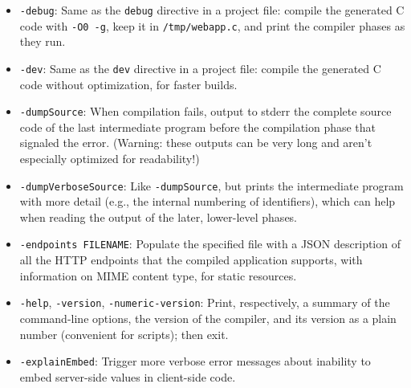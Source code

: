 \documentclass{article}
\begin{document}
\begin{itemize}
\begin{itemize}
    A command sequence like this can initialize a MySQL database:
    \begin{verbatim}
echo "CREATE DATABASE app" | mysql
mysql -D app <app.sql
    \end{verbatim}

  \item \texttt{sqlite}: This is SQLite, a simple filesystem-based transactional database engine.  With this backend, Ur/Web applications can run without any additional server processes.  The other engines are generally preferred for large-workload performance and full admin feature sets, while SQLite is popular for its low resource footprint and ease of set-up.

    A command like this can initialize an SQLite database:
    \begin{verbatim}
sqlite3 path/to/database/file <app.sql
    \end{verbatim}
  \end{itemize}

\item \texttt{-debug}: Same as the \texttt{debug} directive in a project file: compile the generated C code with \texttt{-O0 -g}, keep it in \texttt{/tmp/webapp.c}, and print the compiler phases as they run.
\item \texttt{-dev}: Same as the \texttt{dev} directive in a project file: compile the generated C code without optimization, for faster builds.
\item \texttt{-dumpSource}: When compilation fails, output to stderr the complete source code of the last intermediate program before the compilation phase that signaled the error.  (Warning: these outputs can be very long and aren't especially optimized for readability!)

\item \texttt{-dumpVerboseSource}: Like \texttt{-dumpSource}, but prints the intermediate program with more detail (e.g., the internal numbering of identifiers), which can help when reading the output of the later, lower-level phases.
\item \texttt{-endpoints FILENAME}: Populate the specified file with a JSON description of all the HTTP endpoints that the compiled application supports, with information on MIME content type, for static resources.

\item \texttt{-help}, \texttt{-version}, \texttt{-numeric-version}: Print, respectively, a summary of the command-line options, the version of the compiler, and its version as a plain number (convenient for scripts); then exit.
\item \texttt{-explainEmbed}: Trigger more verbose error messages about inability to embed server-side values in client-side code.


\end{itemize}
\end{document}
